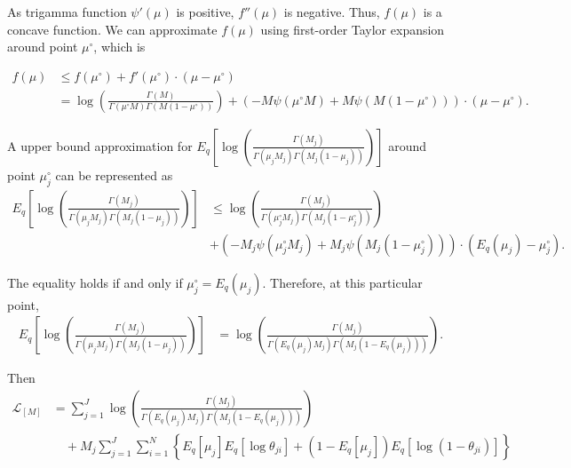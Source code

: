 \documentclass[11pt,reqno]{amsart}
\begin{document}
 As trigamma function $ \psi'(\mu) $ is positive, $ f''(\mu) $ is negative. Thus, $ f(\mu) $ is a concave function. We can approximate $ f(\mu) $ using first-order Taylor expansion around point $ \mu^{\circ} $, which is

\begin{equation}
\begin{split}
f(\mu) &\leq f(\mu^{\circ}) + f'(\mu^{\circ}) \cdot (\mu-\mu^{\circ}) \nonumber \\
&= \log\left( \frac{\Gamma(M)}{\Gamma(\mu^{\circ} M) \Gamma(M (1-\mu^{\circ} ))}\right) + \left( -M \psi (\mu^{\circ} M) + M \psi(M (1-\mu^{\circ} ))\right) \cdot (\mu-\mu^{\circ}).
\end{split}
\end{equation}

A upper bound approximation for $ E_q  \left[ \log \left( \frac{ \Gamma(M_j) } { \Gamma(\mu_j M_j) \Gamma(M_j (1-\mu_j)) }\right) \right] $ around point $ \mu_j^{\circ} $ can be represented as
\begin{equation}
\begin{split}
E_q  \left[ \log \left( \frac{ \Gamma(M_j) } { \Gamma(\mu_j M_j) \Gamma(M_j (1-\mu_j)) }\right) \right] &\leq \log\left( \frac{\Gamma(M_j)}{\Gamma(\mu_j^{\circ} M_j) \Gamma(M_j (1-\mu_j^{\circ} ))}\right) \\
\quad &+ \left( -M_j \psi (\mu_j^{\circ} M_j) + M_j \psi(M_j (1-\mu_j^{\circ} ))\right) \cdot (E_q(\mu_j)-\mu_j^{\circ}).\nonumber
\end{split}
\end{equation}

The equality holds if and only if $ \mu_j^{\circ} =E_q(\mu_j) $. Therefore, at this particular point,
\begin{equation}
\begin{split}
E_q  \left[ \log \left( \frac{ \Gamma(M_j) } { \Gamma(\mu_j M_j) \Gamma(M_j (1-\mu_j)) }\right) \right] &= \log\left( \frac{\Gamma(M_j)}{\Gamma(E_q(\mu_j) M_j) \Gamma(M_j (1-E_q(\mu_j) ))}\right).\nonumber
\end{split}
\end{equation}

Then
\begin{equation}
\begin{split}
\label{M}
\mathcal{L}_{{[M]}} 
&= \sum_{j=1}^{J} \log\left( \frac{\Gamma(M_j)}{\Gamma(E_q(\mu_j) M_j) \Gamma(M_j (1-E_q(\mu_j) ))}\right) \\ 
&\quad + M_j \sum_{j=1}^{J} \sum_{i=1}^{N} \left\lbrace E_q \left[ \mu_j \right] E_q \left[ \log \theta_{ji} \right] + \left( 1 - E_q\left[ \mu_j \right]  \right) E_q\left[ \log \left( 1 - \theta_{ji}\right) \right] \right\rbrace \\
\end{split}
\end{equation}
\end{document}

